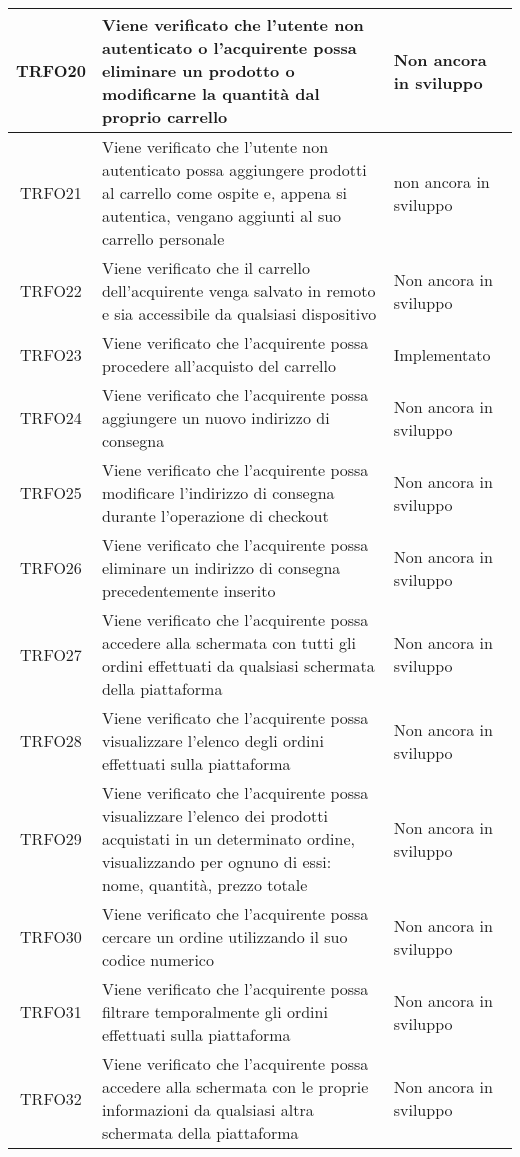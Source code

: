 \begin{longtable}{|c| C{10cm} |C{3cm}|}
    	TRFO20 & Viene verificato che l'utente non autenticato o l'acquirente possa eliminare un prodotto o modificarne la quantità dal proprio carrello & Non ancora in sviluppo\\ \hline
	TRFO21 & Viene verificato che l'utente non autenticato possa aggiungere prodotti al carrello come ospite e, appena si autentica, vengano aggiunti al suo carrello personale & non ancora in sviluppo\\ \hline
	TRFO22 & Viene verificato che il carrello dell'acquirente venga salvato in remoto e sia accessibile da qualsiasi dispositivo & Non ancora in sviluppo\\ \hline
   	TRFO23 & Viene verificato che l'acquirente possa procedere all'acquisto del carrello & Implementato\\ \hline
   	TRFO24 & Viene verificato che l'acquirente possa aggiungere un nuovo indirizzo di consegna & Non ancora in sviluppo\\ \hline
   	TRFO25 & Viene verificato che l'acquirente possa modificare l'indirizzo di consegna durante l'operazione di checkout & Non ancora in sviluppo\\ \hline
	TRFO26 & Viene verificato che l'acquirente possa eliminare un indirizzo di consegna precedentemente inserito & Non ancora in sviluppo\\ \hline
	TRFO27 & Viene verificato che l'acquirente possa accedere alla schermata con tutti gli ordini effettuati da qualsiasi schermata della piattaforma & Non ancora in sviluppo \\ \hline
	TRFO28 & Viene verificato che l'acquirente possa visualizzare l'elenco degli ordini effettuati sulla piattaforma & Non ancora in sviluppo\\ \hline
	TRFO29 & Viene verificato che l'acquirente possa visualizzare l'elenco dei prodotti acquistati in un determinato ordine, visualizzando per ognuno di essi: nome, quantità, prezzo totale & Non ancora in sviluppo\\ \hline
	TRFO30 & Viene verificato che l'acquirente possa cercare un ordine utilizzando il suo codice numerico & Non ancora in sviluppo\\ \hline
	TRFO31 & Viene verificato che l'acquirente possa filtrare temporalmente gli ordini effettuati sulla piattaforma & Non ancora in sviluppo\\ \hline
	TRFO32 & Viene verificato che l'acquirente possa accedere alla schermata con le proprie informazioni da qualsiasi altra schermata della piattaforma & Non ancora in sviluppo\\ \hline

\end{longtable}
